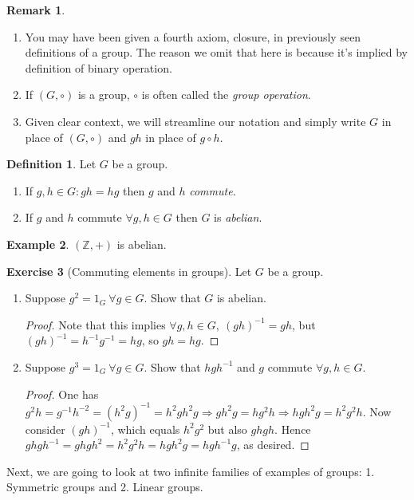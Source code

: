 \documentclass[a4paper]{article}
\theoremstyle{definition}
\newtheorem{defn}{Definition}[subsection]
\newtheorem{example}[defn]{Example}
\newtheorem{exe}[defn]{Exercise}
\newtheorem*{remark}{Remark}
\begin{document}
\begin{remark}
\begin{enumerate}
\item You may have been given a fourth axiom, closure, in previously seen definitions of a group. The reason we omit that here is because it's implied by definition of binary operation.
\item If $(G,\circ)$ is a group, $\circ$ is often called the \textit{group operation}.
\item Given clear context, we will streamline our notation and simply write $G$ in place of $(G,\circ)$ and $gh$ in place of $g\circ h$.
\end{enumerate}
\end{remark}

\begin{defn}
Let $G$ be a group.
\begin{enumerate}
\item If $g,h\in G : gh=hg$ then $g$ and $h$ \textit{commute}.
\item If $g$ and $h$ commute $\forall g,h \in G$ then $G$ is \textit{abelian}.
\end{enumerate}
\end{defn}

\begin{example}
$(\mathbb Z,+)$ is abelian.
\end{example}

\begin{exe}[Commuting elements in groups]
Let $G$ be a group.
\begin{enumerate}
\item Suppose $g^2=1_G \ \forall g\in G$. Show that $G$ is abelian.
\begin{proof}
Note that this implies $\forall g,h\in G,\ (gh)^{-1}=gh$, but $(gh)^{-1}=h^{-1}g^{-1}=hg$, so $gh=hg$.
\end{proof}
\item Suppose $g^3=1_G \ \forall g\in G$. Show that $hgh^{-1}$ and $g$ commute $\forall g,h\in G$.
\begin{proof}
One has $g^2h=g^{-1}h^{-2}=(h^2g)^{-1}=h^2gh^2g\Rightarrow gh^2g=hg^2h\Rightarrow  hgh^2g=h^2g^2h$. Now consider $(gh)^{-1}$, which equals $h^2g^2$ but also $ghgh$. Hence $ghgh^{-1}=ghgh^2=h^2g^2h=hgh^2g=hgh^{-1}g$, as desired.
\end{proof}
\end{enumerate}
\end{exe}

Next, we are going to look at two infinite families of examples of groups: 1. Symmetric groups and 2. Linear groups.
\end{document}
